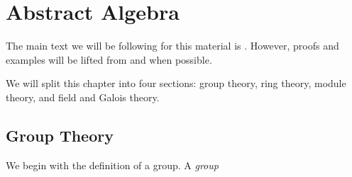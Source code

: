 \chapter{Abstract Algebra}
The main text we will be following for this material is
\cite{hungerford}. However, proofs and examples will be lifted from
\cite{dummit-foote} and \cite{herstein} when possible.

We will split this chapter into four sections: group theory, ring
theory, module theory, and field and Galois theory.

\section{Group Theory}
We begin with the definition of a group. A \emph{group}


